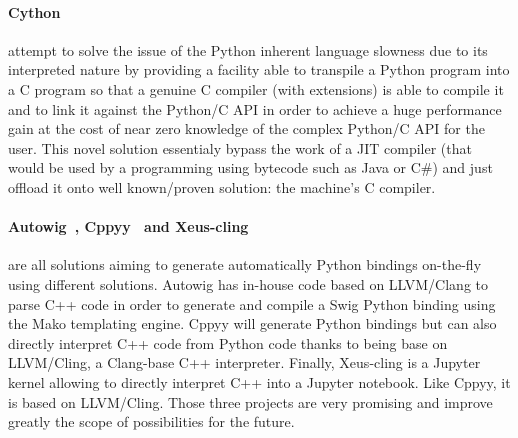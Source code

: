 \paragraph{Cython~\parencite{behnel.2010.cython}} attempt to solve the issue of the Python inherent language slowness
due to its interpreted nature by providing a facility able to transpile a Python program into a C program so that a
genuine C compiler (with extensions) is able to compile it and to link it against the Python/C API in order to achieve a
huge performance gain at the cost of near zero knowledge of the complex Python/C API for the user. This novel solution
essentialy bypass the work of a JIT compiler (that would be used by a programming using bytecode such as Java or C\#)
and just offload it onto well known/proven solution: the machine's C compiler.

\paragraph{Autowig~\parencite{fernique.2018.autowig}, Cppyy~\parencite{wimtlplavrijsen.2016.cppyy} and
  Xeus-cling~\parencite{quantstack.2021.xeus-cling}} are all solutions aiming to generate automatically Python bindings
on-the-fly using different solutions. Autowig has in-house code based on LLVM/Clang to parse C++ code in order to
generate and compile a Swig Python binding using the Mako templating engine. Cppyy will generate Python bindings but can
also directly interpret C++ code from Python code thanks to being base on LLVM/Cling, a Clang-base C++ interpreter.
Finally, Xeus-cling is a Jupyter~\parencite{kluyver.2016.jupyter} kernel allowing to directly interpret C++ into a
Jupyter notebook. Like Cppyy, it is based on LLVM/Cling. Those three projects are very promising and improve greatly the
scope of possibilities for the future.
